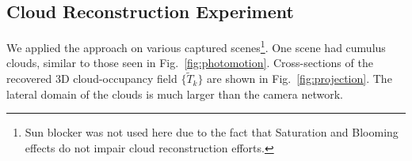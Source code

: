 \documentclass[runningheads]{llncs}
\begin{document}
\subsection*{Cloud Reconstruction Experiment}
\label{sec:results}

We applied the approach on various captured scenes\footnote{Sun blocker was not used here due to the fact that Saturation and Blooming effects do not impair cloud reconstruction efforts.}. One scene had cumulus clouds, similar to those seen in Fig.~\ref{fig:photomotion}.
%
%
Cross-sections of the recovered 3D cloud-occupancy field $\{\tilde T_k\}$ are shown in Fig.~\ref{fig:projection}. The lateral domain of the clouds is much larger than the camera network.
\end{document}
